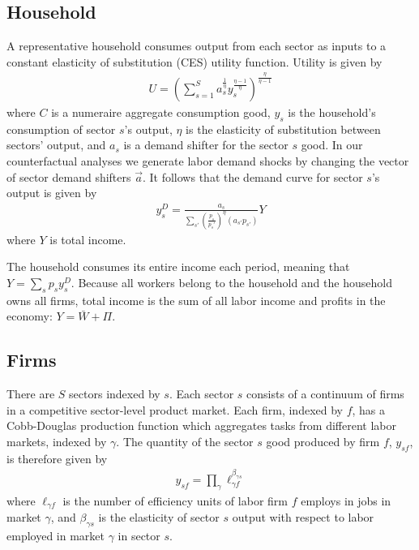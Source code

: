 \documentclass[12pt]{article}
\def\g{\gamma}
\theoremstyle{definition}
\theoremstyle{plain}
\begin{document}
\subsection{Household}

A representative household consumes output from each sector as inputs to a constant elasticity of substitution (CES) utility function. Utility is given by
\begin{align}
U =\left ( \sum_{s=1}^S a_s^\frac{1}{\eta} y_s^{\frac{\eta-1}{\eta}} \right )^{\frac{\eta}{\eta-1}} \label{eq:utility}
\end{align}
where $C$ is a numeraire aggregate consumption good, $y_s$ is the household's consumption of sector $s$'s output, $\eta$ is the elasticity of substitution between sectors' output, and $a_s$ is a demand shifter for the sector $s$ good. In our counterfactual analyses we generate labor demand shocks by changing the vector of sector demand shifters $\vec{a}$.  It follows that the demand curve for sector $s$'s output is given by 
\begin{align}
 y_s^D =  \frac{ a_s }{ \sum_{s'} \left(\frac{p_s}{p_s'}\right)^{\eta} \left(a_{s'} p_{s'}\right)}Y \label{eq:consumer_demand} %
\end{align}
where $Y$ is total income.

The household consumes its entire income each period, meaning that $Y= \sum_{s} p_s y_s^D$. Because all workers belong to the household and the household owns all firms, total income is the sum of all labor income and profits in the economy: $Y = \bar W + \Pi$.




\subsection{Firms}
\label{sec:model_firms}


There are $S$ sectors indexed by $s$. Each sector $s$ consists of a continuum of firms in a competitive sector-level product market. Each firm, indexed by $f$, has a Cobb-Douglas production function which aggregates tasks from different labor markets, indexed by $\g$.  The quantity of the sector $s$ good produced by firm $f$, $y_{sf}$, is therefore given by
\begin{align}
y_{sf} = \prod_{\g} \ell_{\g f}^{\beta_{\g s}}  \label{eq:int_prod}
\end{align}
where $\ell_{\g f}$ is the number of efficiency units of labor firm $f$ employs in jobs in market $\g$, and $\beta_{\g s}$ is the elasticity of sector $s$ output with respect to labor employed in market $\g$ in sector $s$.
\end{document}
